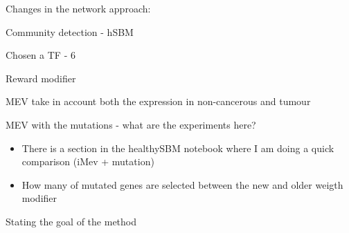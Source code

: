Changes in the network approach:
\begin{todolist}
    \item Community detection - hSBM
    \item Chosen a TF - 6
    \item [\done] Reward modifier
    \item [\done] MEV take in account both the expression in non-cancerous and tumour
    \item MEV with the mutations - what are the experiments here?
    \begin{itemize}
        \item There is a section in the healthySBM notebook where I am doing a quick comparison (iMev + mutation)
        \item How many of mutated genes are selected between the new and older weigth modifier
    \end{itemize}
    \item Stating the goal of the method
\end{todolist}

